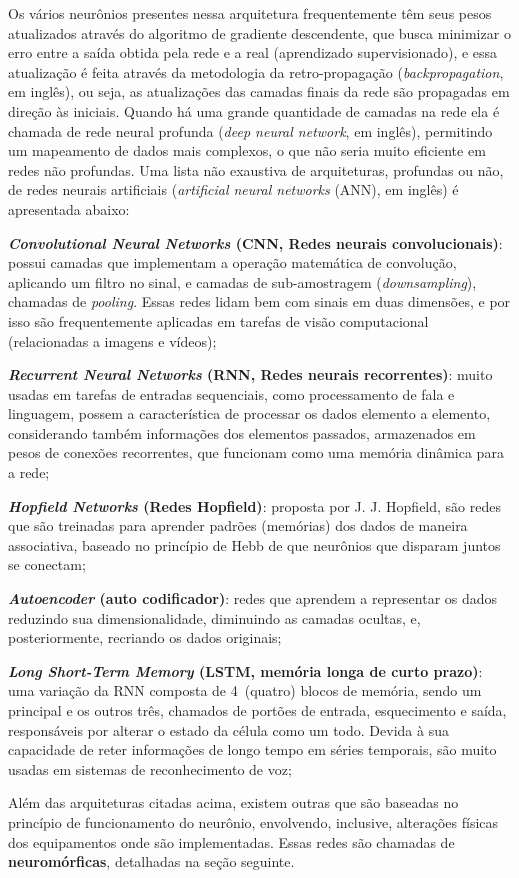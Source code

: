 Os vários neurônios presentes nessa arquitetura frequentemente têm seus pesos atualizados através do algoritmo de gradiente descendente, que busca minimizar o erro entre a saída obtida pela rede e a real (aprendizado supervisionado), e essa atualização é feita através da metodologia da retro-propagação (\textit{backpropagation}, em inglês), ou seja, as atualizações das camadas finais da rede são propagadas em direção às iniciais.
Quando há uma grande quantidade de camadas na rede ela é chamada de rede neural profunda (\textit{deep neural network}, em inglês), permitindo um mapeamento de dados mais complexos, o que não seria muito eficiente em redes não profundas. Uma lista não exaustiva de arquiteturas, profundas ou não, de redes neurais artificiais (\textit{artificial neural networks} (ANN), em inglês) é apresentada abaixo:
\begin{alineas}
	\item \textbf{\textit{Convolutional Neural Networks} (CNN, Redes neurais convolucionais)}: possui camadas que implementam a operação matemática de convolução, aplicando um filtro no sinal, e camadas de sub-amostragem (\textit{downsampling}), chamadas de \textit{pooling}. Essas redes lidam bem com sinais em duas dimensões, e por isso são frequentemente aplicadas em tarefas de visão computacional (relacionadas a imagens e vídeos);
	\item \textbf{\textit{Recurrent Neural Networks} (RNN, Redes neurais recorrentes)}: muito usadas em tarefas de entradas sequenciais, como processamento de fala e linguagem, possem a característica de processar os dados elemento a elemento, considerando também informações dos elementos passados, armazenados em pesos de conexões recorrentes, que funcionam como uma memória dinâmica para a rede;
	\item \textbf{\textit{Hopfield Networks} (Redes Hopfield)}: proposta por J. J. Hopfield, são redes que são treinadas para aprender padrões (memórias) dos dados de maneira associativa, baseado no princípio de Hebb de que neurônios que disparam juntos se conectam;
	\item \textbf{\textit{Autoencoder} (auto codificador)}: redes que aprendem a representar os dados reduzindo sua dimensionalidade, diminuindo as camadas ocultas, e, posteriormente, recriando os dados originais;
	\item \textbf{\textit{Long Short-Term Memory} (LSTM, memória longa de curto prazo)}: uma variação da RNN composta de 4~(quatro) blocos de memória, sendo um principal e os outros três, chamados de portões de entrada, esquecimento e saída, responsáveis por alterar o estado da célula como um todo.
	Devida à sua capacidade de reter informações de longo tempo em séries temporais, são muito usadas em sistemas de reconhecimento de voz;
\end{alineas}
Além das arquiteturas citadas acima, existem outras que são baseadas no princípio de funcionamento do neurônio, envolvendo, inclusive, alterações físicas dos equipamentos onde são implementadas. Essas redes são chamadas de \textbf{neuromórficas}, detalhadas na seção seguinte.

